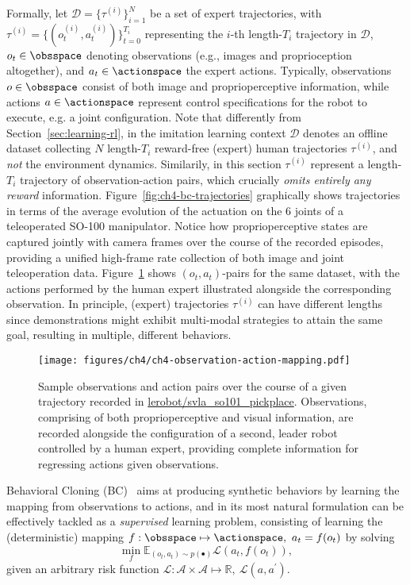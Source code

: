 Formally, let \( \mathcal D = \{ \tau^{(i)} \}_{i=1}^N \) be a set of expert trajectories, with \( \tau^{(i)} = \{(o_t^{(i)}, a_t^{(i)})\}_{t=0}^{T_i} \) representing the \(i\)-th length-\(T_i\) trajectory in \( \mathcal D \), \(o_t \in \obsspace \) denoting observations (e.g., images and proprioception altogether), and \(a_t \in \actionspace \) the expert actions.
Typically, observations \( o \in \obsspace \) consist of both image and proprioperceptive information, while actions \( a \in \actionspace \) represent control specifications for the robot to execute, e.g. a joint configuration.
Note that differently from Section~\ref{sec:learning-rl}, in the imitation learning context \( \mathcal D \) denotes an offline dataset collecting \( N \) length-\( T_i \) reward-free (expert) human trajectories \( \tau^{(i)} \), and \emph{not} the environment dynamics.
Similarily, in this section \( \tau^{(i)} \) represent a length-\(T_i\) trajectory of observation-action pairs, which crucially \emph{omits entirely any reward} information.
Figure~\ref{fig:ch4-bc-trajectories} graphically shows trajectories in terms of the average evolution of the actuation on the 6 joints of a teleoperated SO-100 manipulator.
Notice how proprioperceptive states are captured jointly with camera frames over the course of the recorded episodes, providing a unified high-frame rate collection of both image and joint teleoperation data.
Figure~\ref{fig:ch4-observation-action-mapping} shows \( (o_t, a_t) \)-pairs for the same dataset, with the actions performed by the human expert illustrated alongside the corresponding observation.
In principle, (expert) trajectories \( \tau^{(i)} \) can have different lengths since demonstrations might exhibit multi-modal strategies to attain the same goal, resulting in multiple, different behaviors.


\begin{figure}
    \centering
    \texttt{[image: figures/ch4/ch4-observation-action-mapping.pdf]}
    \caption{Sample observations and action pairs over the course of a given trajectory recorded in \url{lerobot/svla_so101_pickplace}. Observations, comprising of both proprioperceptive and visual information, are recorded alongside the configuration of a second, leader robot controlled by a human expert, providing complete information for regressing actions given observations.}
    \label{fig:ch4-observation-action-mapping}
\end{figure}

Behavioral Cloning (BC)~\citep{pomerleauALVINNAutonomousLand1988} aims at producing synthetic behaviors by learning the mapping from observations to actions, and in its most natural formulation can be effectively tackled as a \emph{supervised} learning problem, consisting of learning the (deterministic) mapping \(f: \obsspace \mapsto \actionspace, \ a_t = f(o_t) \) by solving
\begin{equation}\label{eq:loss-minimization-SL}
    \min_{f} \mathbb{E}_{(o_t, a_t) \sim p(\bullet)} \mathcal L(a_t, f(o_t)),
\end{equation}
given an arbitrary risk function \( \mathcal L:  \mathcal A \times \mathcal A \mapsto \mathbb{R}, \ \mathcal L (a, a^\prime) \).

